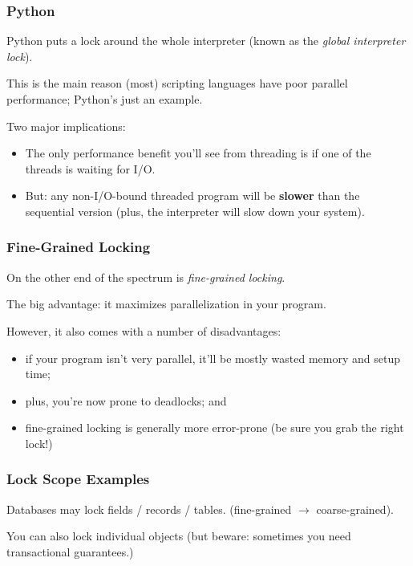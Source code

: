 \begin{frame}
\frametitle{Python}

Python puts a lock around the whole interpreter (known as the
\emph{global interpreter lock}).  

This is the main reason (most) scripting languages have poor parallel performance; Python's just an example.

Two major implications:
\begin{itemize}
\item The only performance benefit you'll see from threading is if one of the threads is
      waiting for I/O.
\item But: any non-I/O-bound threaded program will be {\bf slower} than the sequential
      version (plus, the interpreter will slow down your system).
\end{itemize}


\end{frame}

\begin{frame}
\frametitle{Fine-Grained Locking}

On the other end of the spectrum is \emph{fine-grained locking}. 

The big
advantage: it maximizes parallelization in your program.

However, it also comes with a number of disadvantages:
  \begin{itemize}
    \item if your program isn't very parallel, it'll be mostly wasted memory and setup time;
    \item plus, you're now prone to deadlocks; and
    \item fine-grained locking is generally more error-prone (be sure you grab the right lock!)
  \end{itemize}

\end{frame}

\begin{frame}
\frametitle{Lock Scope Examples}


    Databases may lock fields / records / tables. (fine-grained $\rightarrow$ coarse-grained).

    You can also lock individual objects (but beware: sometimes you need transactional guarantees.)



\end{frame}








